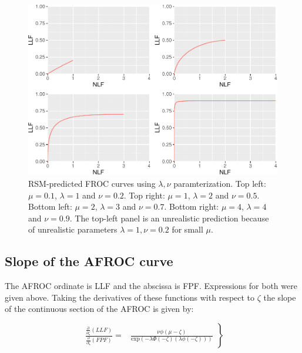 \documentclass[
]{book}
\begin{document}
\begin{figure}
\centering
\includegraphics{08-rsm-predictions2_files/figure-latex/rsm-other-predictions-froc-plots-lambda-nu-1.pdf}
\caption{\label{fig:rsm-other-predictions-froc-plots-lambda-nu}RSM-predicted FROC curves using \(\lambda, \nu\) paramterization. Top left: \(\mu = 0.1\), \(\lambda = 1\) and \(\nu = 0.2\). Top right: \(\mu = 1\), \(\lambda = 2\) and \(\nu = 0.5\). Bottom left: \(\mu = 2\), \(\lambda = 3\) and \(\nu = 0.7\). Bottom right: \(\mu = 4\), \(\lambda = 4\) and \(\nu = 0.9\). The top-left panel is an unrealistic prediction because of unrealistic parameters \(\lambda =1, \nu = 0.2\) for small \(\mu\).}
\end{figure}

\hypertarget{rsm-other-predictions-afroc-physical-parameters}{%
\subsection{Slope of the AFROC curve}\label{rsm-other-predictions-afroc-physical-parameters}}

The AFROC ordinate is LLF and the abscissa is FPF. Expressions for both were given above. Taking the derivatives of these functions with respect to \(\zeta\) the slope of the continuous section of the AFROC is given by:

\begin{equation}
\left. 
\begin{aligned}
\frac{\frac{\partial }{\partial \zeta}\left( LLF \right)}{\frac{\partial }{\partial \zeta}\left( FPF \right)} 
=& \frac{\nu \phi \left ( \mu-\zeta \right )}{\text{exp}\left( -\lambda \Phi\left(- \zeta \right)\left( \lambda\phi\left( -\zeta \right)  \right) \right)} 
\end{aligned}
\right \} 
\label{eq:rsm-other-predictions-afroc-slope}
\end{equation}
\end{document}
